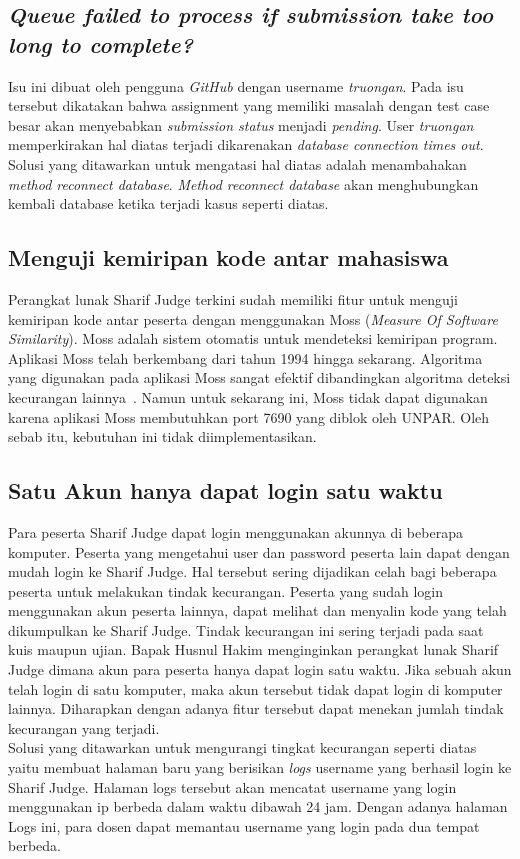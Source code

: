 \subsection{\textit{Queue failed to process if submission take too long to complete?}}
Isu ini dibuat oleh pengguna \textit{GitHub} dengan username \textit{truongan}. Pada isu tersebut dikatakan bahwa assignment yang memiliki masalah dengan test case besar akan menyebabkan \textit{submission status} menjadi \textit{pending}. User \textit{truongan} memperkirakan hal diatas terjadi dikarenakan \textit{database connection times out}. Solusi yang ditawarkan untuk mengatasi hal diatas adalah menambahakan \textit{method reconnect database}. \textit{Method reconnect database} akan menghubungkan kembali database ketika terjadi kasus seperti diatas.


\subsection{Menguji kemiripan kode antar mahasiswa}
Perangkat lunak Sharif Judge terkini sudah memiliki fitur untuk menguji kemiripan kode antar peserta dengan menggunakan Moss (\textit{Measure Of Software Similarity}). Moss adalah sistem otomatis untuk mendeteksi kemiripan program. Aplikasi Moss telah berkembang dari tahun 1994 hingga sekarang. Algoritma yang digunakan pada aplikasi Moss sangat efektif dibandingkan algoritma deteksi kecurangan lainnya~\cite{aiken:10:moss}. Namun untuk sekarang ini, Moss tidak dapat digunakan karena aplikasi Moss membutuhkan port 7690 yang diblok oleh UNPAR. Oleh sebab itu, kebutuhan ini tidak diimplementasikan.

\subsection{Satu Akun hanya dapat login satu waktu}
Para peserta Sharif Judge dapat login menggunakan akunnya di beberapa komputer. Peserta yang mengetahui user dan password peserta lain dapat dengan mudah login ke Sharif Judge. Hal tersebut sering dijadikan celah bagi beberapa peserta untuk melakukan tindak kecurangan. Peserta yang sudah login menggunakan akun peserta lainnya, dapat melihat dan menyalin kode yang telah dikumpulkan ke Sharif Judge. Tindak kecurangan ini sering terjadi pada saat kuis maupun ujian. Bapak Husnul Hakim menginginkan perangkat lunak Sharif Judge dimana akun para peserta hanya dapat login satu waktu. Jika sebuah akun telah login di satu komputer, maka akun tersebut tidak dapat login di komputer lainnya. Diharapkan dengan adanya fitur tersebut dapat menekan jumlah tindak kecurangan yang terjadi. \\
Solusi yang ditawarkan untuk mengurangi tingkat kecurangan seperti diatas yaitu membuat halaman baru yang berisikan \textit{logs} username yang berhasil login ke Sharif Judge. Halaman logs tersebut akan mencatat username yang login menggunakan ip berbeda dalam waktu dibawah 24 jam. Dengan adanya halaman Logs ini, para dosen dapat memantau username yang login pada dua tempat berbeda.	

